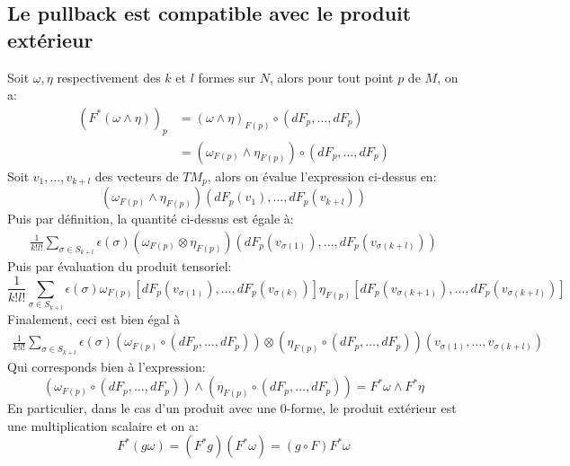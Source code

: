    \subsection*{Le pullback est compatible avec le produit extérieur}  
      Soit $\omega, \eta$ respectivement des $k$ et $l$ formes sur $N$, alors pour tout point $p$ de $M$, on a:
      \begin{align*}
         (F^*(\omega \wedge \eta))_p &= (\omega \wedge \eta)_{F(p)} \circ (dF_{p}, \ldots, dF_{p})\\ 
         &=   (\omega_{F(p)} \wedge \eta_{F(p)}) \circ (dF_{p}, \ldots, dF_{p})
      \end{align*}
      Soit $v_1, \ldots, v_{k+l}$ des vecteurs de $TM_p$, alors on évalue l'expression ci-dessus en:
      $$
         (\omega_{F(p)} \wedge \eta_{F(p)}) (dF_{p}(v_1), \ldots, dF_{p}(v_{k+l}))
      $$
      Puis par définition, la quantité ci-dessus est égale à:
      \begin{align*}
         \frac{1}{k!l!} \sum_{\sigma \in S_{k+l}} \epsilon(\sigma) (\omega_{F(p)} \otimes \eta_{F(p)})(dF_{p}(v_{\sigma(1)}), \ldots, dF_{p}(v_{\sigma(k+l)}))
      \end{align*}
      Puis par évaluation du produit tensoriel:
      $$
         \frac{1}{k!l!} \sum_{\sigma \in S_{k+l}} \epsilon(\sigma) \omega_{F(p)}\left[dF_{p}(v_{\sigma(1)}), \ldots, dF_p(v_{\sigma(k)})\right] \eta_{F(p)}\left[dF_{p}(v_{\sigma(k+1)}), \ldots, dF_p(v_{\sigma(k+l)})\right]
      $$
      Finalement, ceci est bien égal à
      \begin{align*}
         \frac{1}{k!l!} \sum_{\sigma \in S_{k+l}} \epsilon(\sigma) (\omega_{F(p)} \circ (dF_p, \ldots, dF_p)) \otimes (\eta_{F(p)} \circ (dF_p, \ldots, dF_p))(v_{\sigma(1)}, \ldots, v_{\sigma(k+l)})
      \end{align*}
      Qui corresponds bien à l'expression:
      $$
         (\omega_{F(p)} \circ (dF_{p}, \ldots, dF_{p})) \wedge (\eta_{F(p)} \circ (dF_{p}, \ldots, dF_{p})) = F^*\omega \wedge F^*\eta
      $$
      En particulier, dans le cas d'un produit avec une 0-forme, le produit extérieur est une multiplication scalaire et on a:
      $$
         F^*(g\omega) = (F^*g)(F^*\omega) = (g \circ F)F^*\omega
      $$    
